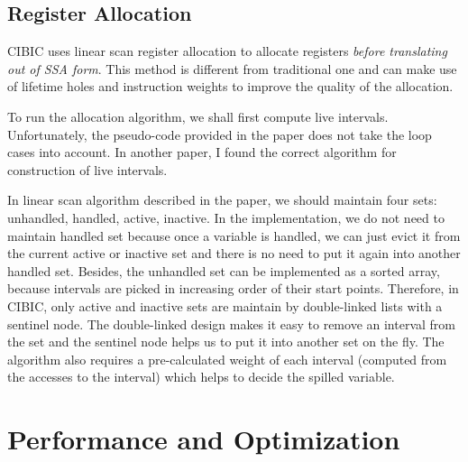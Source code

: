 \documentclass[10pt, a4paper]{article}
\begin{document}
\subsection{Register Allocation}
CIBIC uses linear scan register allocation to allocate registers \emph{before
translating out of SSA form}. This method is different from traditional one and
can make use of lifetime holes and instruction weights to improve the quality of
the allocation.

To run the allocation algorithm, we shall first compute live intervals.
Unfortunately, the pseudo-code provided in the paper does not take the loop
cases into account. In another paper, I found the correct algorithm for
construction of live intervals.

In linear scan algorithm described in the paper, we should maintain four sets:
unhandled, handled, active, inactive. In the implementation, we do not need to
maintain handled set because once a variable is handled, we can just evict it
from the current active or inactive set and there is no need to put it again
into another handled set. Besides, the unhandled set can be implemented as a
sorted array, because intervals are picked in increasing order of their start
points. Therefore, in CIBIC, only active and inactive sets are maintain by
double-linked lists with a sentinel node. The double-linked design makes it easy
to remove an interval from the set and the sentinel node helps us to put it into
another set on the fly. The algorithm also requires a pre-calculated weight of
each interval (computed from the accesses to the interval) which helps to decide
the spilled variable.
\section{Performance and Optimization}
\end{document}

